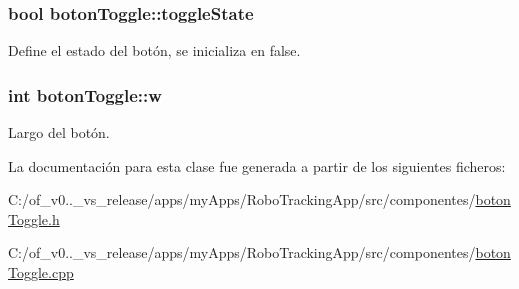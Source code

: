 \subsubsection[{toggle\+State}]{\setlength{\rightskip}{0pt plus 5cm}bool boton\+Toggle\+::toggle\+State\hspace{0.3cm}{\ttfamily [private]}}\label{classboton_toggle_a16e1fc2e8c6b3bfc76f1de28f9623740}


Define el estado del botón, se inicializa en false. 

\hypertarget{classboton_toggle_aa76dc9adf8e8b4513bf839a061ce2129}{}
\subsubsection[{w}]{\setlength{\rightskip}{0pt plus 5cm}int boton\+Toggle\+::w\hspace{0.3cm}{\ttfamily [private]}}\label{classboton_toggle_aa76dc9adf8e8b4513bf839a061ce2129}


Largo del botón. 



La documentación para esta clase fue generada a partir de los siguientes ficheros\+:\begin{DoxyCompactItemize}
\item 
C\+:/of\+\_\+v0..\+\_\+vs\+\_\+release/apps/my\+Apps/\+Robo\+Tracking\+App/src/componentes/\hyperlink{boton_toggle_8h}{boton\+Toggle.\+h}\item 
C\+:/of\+\_\+v0..\+\_\+vs\+\_\+release/apps/my\+Apps/\+Robo\+Tracking\+App/src/componentes/\hyperlink{boton_toggle_8cpp}{boton\+Toggle.\+cpp}\end{DoxyCompactItemize}
